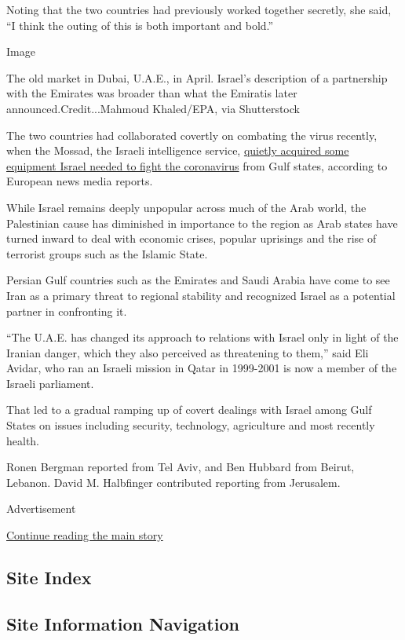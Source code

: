 Noting that the two countries had previously worked together secretly,
she said, ``I think the outing of this is both important and bold.''

Image

The old market in Dubai, U.A.E., in April. Israel's description of a
partnership with the Emirates was broader than what the Emiratis later
announced.Credit...Mahmoud Khaled/EPA, via Shutterstock

The two countries had collaborated covertly on combating the virus
recently, when the Mossad, the Israeli intelligence service,
\href{https://www.nytimes.com/2020/04/12/world/middleeast/coronavirus-israel-mossad.html}{quietly
acquired some equipment Israel needed to fight the coronavirus} from
Gulf states, according to European news media reports.

While Israel remains deeply unpopular across much of the Arab world, the
Palestinian cause has diminished in importance to the region as Arab
states have turned inward to deal with economic crises, popular
uprisings and the rise of terrorist groups such as the Islamic State.

Persian Gulf countries such as the Emirates and Saudi Arabia have come
to see Iran as a primary threat to regional stability and recognized
Israel as a potential partner in confronting it.

``The U.A.E. has changed its approach to relations with Israel only in
light of the Iranian danger, which they also perceived as threatening to
them,'' said Eli Avidar, who ran an Israeli mission in Qatar in
1999-2001 is now a member of the Israeli parliament.

That led to a gradual ramping up of covert dealings with Israel among
Gulf States on issues including security, technology, agriculture and
most recently health.

Ronen Bergman reported from Tel Aviv, and Ben Hubbard from Beirut,
Lebanon. David M. Halbfinger contributed reporting from Jerusalem.

Advertisement

\protect\hyperlink{after-bottom}{Continue reading the main story}

\hypertarget{site-index}{%
\subsection{Site Index}\label{site-index}}

\hypertarget{site-information-navigation}{%
\subsection{Site Information
Navigation}\label{site-information-navigation}}

